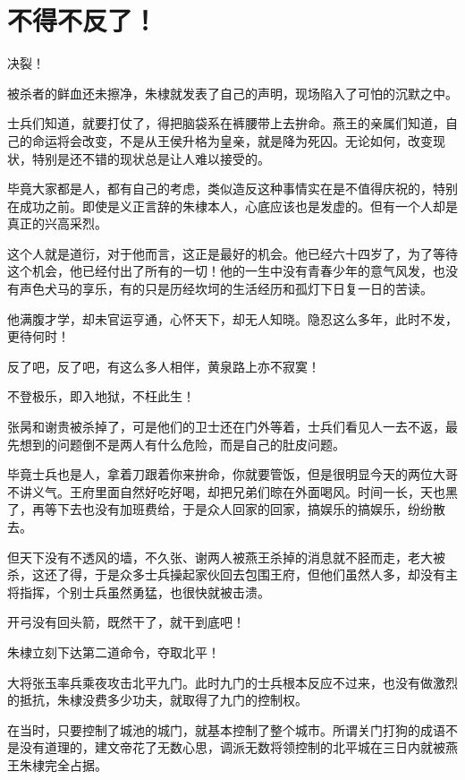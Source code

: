 \section{不得不反了！}
\ifnum{}
	\begin{multicols}{\theparacolNo}
		\fi
		决裂！

		被杀者的鲜血还未擦净，朱棣就发表了自己的声明，现场陷入了可怕的沉默之中。

		士兵们知道，就要打仗了，得把脑袋系在裤腰带上去拚命。燕王的亲属们知道，自己的命运将会改变，不是从王侯升格为皇亲，就是降为死囚。无论如何，改变现状，特别是还不错的现状总是让人难以接受的。

		毕竟大家都是人，都有自己的考虑，类似造反这种事情实在是不值得庆祝的，特别在成功之前。即使是义正言辞的朱棣本人，心底应该也是发虚的。但有一个人却是真正的兴高采烈。

		这个人就是道衍，对于他而言，这正是最好的机会。他已经六十四岁了，为了等待这个机会，他已经付出了所有的一切！他的一生中没有青春少年的意气风发，也没有声色犬马的享乐，有的只是历经坎坷的生活经历和孤灯下日复一日的苦读。

		他满腹才学，却未官运亨通，心怀天下，却无人知晓。隐忍这么多年，此时不发，更待何时！

		反了吧，反了吧，有这么多人相伴，黄泉路上亦不寂寞！

		不登极乐，即入地狱，不枉此生！

		张昺和谢贵被杀掉了，可是他们的卫士还在门外等着，士兵们看见人一去不返，最先想到的问题倒不是两人有什么危险，而是自己的肚皮问题。

		毕竟士兵也是人，拿着刀跟着你来拚命，你就要管饭，但是很明显今天的两位大哥不讲义气。王府里面自然好吃好喝，却把兄弟们晾在外面喝风。时间一长，天也黑了，再等下去也没有加班费给，于是众人回家的回家，搞娱乐的搞娱乐，纷纷散去。

		但天下没有不透风的墙，不久张、谢两人被燕王杀掉的消息就不胫而走，老大被杀，这还了得，于是众多士兵操起家伙回去包围王府，但他们虽然人多，却没有主将指挥，个别士兵虽然勇猛，也很快就被击溃。

		开弓没有回头箭，既然干了，就干到底吧！

		朱棣立刻下达第二道命令，夺取北平！

		大将张玉率兵乘夜攻击北平九门。此时九门的士兵根本反应不过来，也没有做激烈的抵抗，朱棣没费多少功夫，就取得了九门的控制权。

		在当时，只要控制了城池的城门，就基本控制了整个城市。所谓关门打狗的成语不是没有道理的，建文帝花了无数心思，调派无数将领控制的北平城在三日内就被燕王朱棣完全占据。


\end{multicols}
